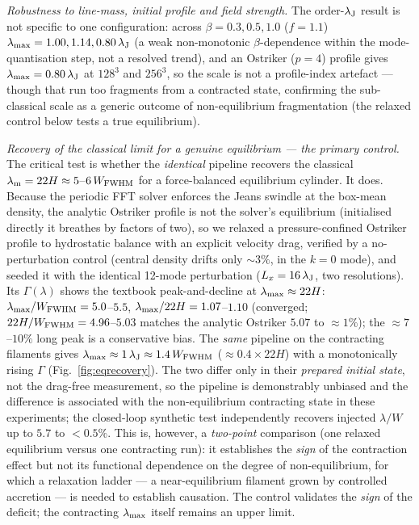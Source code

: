 \documentclass[usenatbib,twoside,twocolumn]{mnras}
\begin{document}
\emph{Robustness to line-mass, initial profile and field strength.} The order-$\lambda_{\rm J}$ result is not specific to one configuration: across $\beta=0.3,0.5,1.0$ ($f=1.1$) $\lambda_{\rm max}=1.00,1.14,0.80\,\lambda_{\rm J}$ (a weak non-monotonic $\beta$-dependence within the mode-quantisation step, not a resolved trend), and an Ostriker ($p=4$) profile gives $\lambda_{\rm max}=0.80\,\lambda_{\rm J}$ at $128^3$ and $256^3$, so the scale is not a profile-index artefact --- though that run too fragments from a contracted state, confirming the sub-classical scale as a generic outcome of non-equilibrium fragmentation (the relaxed control below tests a true equilibrium).

\emph{Recovery of the classical limit for a genuine equilibrium --- the primary control.} The critical test is whether the \emph{identical} pipeline recovers the classical $\lambda_{\rm m}=22H\approx5$--$6\,W_{\rm FWHM}$ for a force-balanced equilibrium cylinder. It does. Because the periodic FFT solver enforces the Jeans swindle at the box-mean density, the analytic Ostriker profile is not the solver's equilibrium (initialised directly it breathes by factors of two), so we relaxed a pressure-confined Ostriker profile to hydrostatic balance with an explicit velocity drag, verified by a no-perturbation control (central density drifts only $\sim3\%$, in the $k=0$ mode), and seeded it with the identical 12-mode perturbation ($L_x=16\,\lambda_{\rm J}$, two resolutions). Its $\Gamma(\lambda)$ shows the textbook peak-and-decline at $\lambda_{\rm max}\approx22H$: $\lambda_{\rm max}/W_{\rm FWHM}=5.0$--$5.5$, $\lambda_{\rm max}/22H=1.07$--$1.10$ (converged; $22H/W_{\rm FWHM}=4.96$--$5.03$ matches the analytic Ostriker $5.07$ to $\approx1\%$); the $\approx7$--$10\%$ long peak is a conservative bias. The \emph{same} pipeline on the contracting filaments gives $\lambda_{\rm max}\approx1\,\lambda_{\rm J}\approx1.4\,W_{\rm FWHM}$ ($\approx0.4\times22H$) with a monotonically rising $\Gamma$ (Fig.~\ref{fig:eqrecovery}). The two differ only in their \emph{prepared initial state}, not the drag-free measurement, so the pipeline is demonstrably unbiased and the difference is associated with the non-equilibrium contracting state in these experiments; the closed-loop synthetic test independently recovers injected $\lambda/W$ up to $5.7$ to $<0.5\%$. This is, however, a \emph{two-point} comparison (one relaxed equilibrium versus one contracting run): it establishes the \emph{sign} of the contraction effect but not its functional dependence on the degree of non-equilibrium, for which a relaxation ladder --- a near-equilibrium filament grown by controlled accretion --- is needed to establish causation. The control validates the \emph{sign} of the deficit; the contracting $\lambda_{\rm max}$ itself remains an upper limit.
\end{document}
